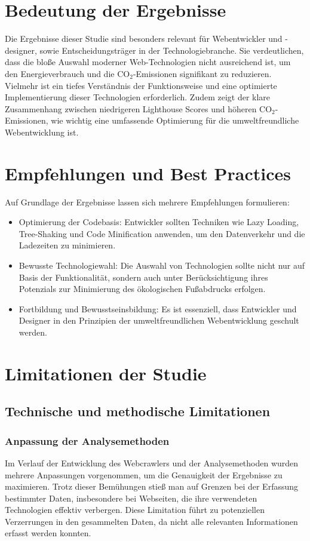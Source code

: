 \documentclass[Bachelor,BIF,german,IEEE]{BASE/twbook}
\begin{document}
\section{Bedeutung der Ergebnisse}
Die Ergebnisse dieser Studie sind besonders relevant für Webentwickler und -designer, sowie Entscheidungsträger in der Technologiebranche. Sie verdeutlichen, dass die bloße Auswahl moderner Web-Technologien nicht ausreichend ist, um den Energieverbrauch und die CO$_2$-Emissionen signifikant zu reduzieren. Vielmehr ist ein tiefes Verständnis der Funktionsweise und eine optimierte Implementierung dieser Technologien erforderlich. Zudem zeigt der klare Zusammenhang zwischen niedrigeren Lighthouse Scores und höheren CO$_2$-Emissionen, wie wichtig eine umfassende Optimierung für die umweltfreundliche Webentwicklung ist.

\section{Empfehlungen und Best Practices}

Auf Grundlage der Ergebnisse lassen sich mehrere Empfehlungen formulieren:

\begin{itemize}
    \item Optimierung der Codebasis: Entwickler sollten Techniken wie Lazy Loading, Tree-Shaking und Code Minification anwenden, um den Datenverkehr und die Ladezeiten zu minimieren.
    \item Bewusste Technologiewahl: Die Auswahl von Technologien sollte nicht nur auf Basis der Funktionalität, sondern auch unter Berücksichtigung ihres Potenzials zur Minimierung des ökologischen Fußabdrucks erfolgen.
    \item Fortbildung und Bewusstseinsbildung: Es ist essenziell, dass Entwickler und Designer in den Prinzipien der umweltfreundlichen Webentwicklung geschult werden.
\end{itemize}

\section{Limitationen der Studie}
\subsection{Technische und methodische Limitationen}

\subsubsection{Anpassung der Analysemethoden}
Im Verlauf der Entwicklung des Webcrawlers und der Analysemethoden wurden mehrere Anpassungen vorgenommen, um die Genauigkeit der Ergebnisse zu maximieren. Trotz dieser Bemühungen stieß man auf Grenzen bei der Erfassung bestimmter Daten, insbesondere bei Webseiten, die ihre verwendeten Technologien effektiv verbergen. Diese Limitation führt zu potenziellen Verzerrungen in den gesammelten Daten, da nicht alle relevanten Informationen erfasst werden konnten.
\end{document}
